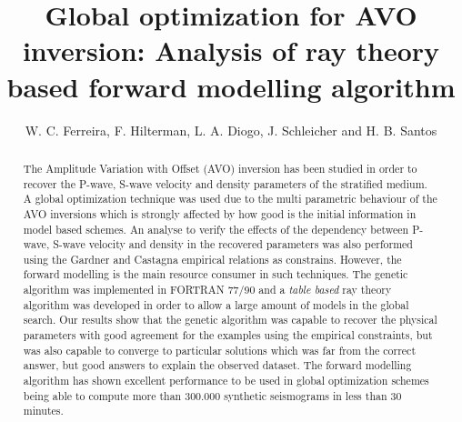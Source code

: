 \documentclass{vie16}
\begin{document}
\title{Global optimization for AVO inversion: Analysis of ray theory based 
forward modelling algorithm}
\author{W. C. Ferreira, F. Hilterman, L. A. Diogo, J. Schleicher and H. B. 
Santos}
\maketitle


\begin{abstract}
The Amplitude Variation with Offset (AVO) inversion has been studied in 
order to recover the P-wave, S-wave velocity and density parameters of the 
stratified medium. A global optimization technique was used due to the 
multi parametric behaviour of the AVO inversions which is strongly affected 
by how good is the initial information in model based schemes. An analyse 
to verify the effects of the dependency between P-wave, S-wave velocity 
and density in the recovered parameters was also performed using the 
Gardner and Castagna empirical relations as constrains. However, the 
forward modelling is the main resource consumer in such techniques. The 
genetic algorithm was implemented in FORTRAN 77/90  and a \textit{table 
based} ray theory algorithm was developed in order to allow a large amount 
of models in the global search. Our results show that the genetic algorithm 
was capable to recover the physical parameters with good agreement for the 
examples using the empirical constraints, but was also capable to converge 
to particular solutions which was far from the correct answer, but good 
answers to explain the observed dataset. The forward modelling algorithm 
has shown excellent performance to be used in global optimization schemes 
being able to compute more than 300.000 synthetic seismograms in less 
than 30 minutes.
\end{abstract}

\newpage
\end{document}
